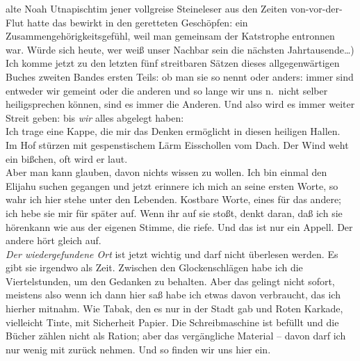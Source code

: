 \documentclass[
]{article}
\begin{document}
alte Noah Utnapischtim jener vollgreise Steineleser aus den Zeiten
von-vor-der-Flut hatte das bewirkt in den geretteten Geschöpfen: ein
Zusammengehörigkeitsgefühl, weil man gemeinsam der Katstrophe entronnen
war. Würde sich heute, wer weiß unser Nachbar sein die nächsten
Jahrtausende\ldots)\\
Ich komme jetzt zu den letzten fünf streitbaren Sätzen dieses
allgegenwärtigen Buches zweiten Bandes ersten Teils: ob man sie so nennt
oder anders: immer sind entweder wir gemeint oder die anderen und so
lange wir uns n.~nicht selber heiligsprechen können, sind es immer die
Anderen. Und also wird es immer weiter Streit geben: bis \emph{wir}
alles abgelegt haben:\\
Ich trage eine Kappe, die mir das Denken ermöglicht in diesen heiligen
Hallen.\\
Im Hof stürzen mit gespenstischem Lärm Eisschollen vom Dach. Der Wind
weht ein bißchen, oft wird er laut.\\
Aber man kann glauben, davon nichts wissen zu wollen. Ich bin einmal den
Elijahu suchen gegangen und jetzt erinnere ich mich an seine ersten
Worte, so wahr ich hier stehe unter den Lebenden. Kostbare Worte, eines
für das andere; ich hebe sie mir für später auf. Wenn ihr auf sie stoßt,
denkt daran, daß ich sie hörenkann wie aus der eigenen Stimme, die
riefe. Und das ist nur ein Appell. Der andere hört gleich auf.\\
\emph{Der wiedergefundene Ort }ist jetzt wichtig und darf nicht
überlesen werden. Es gibt sie irgendwo als Zeit. Zwischen den
Glockenschlägen habe ich die Viertelstunden, um den Gedanken zu
behalten. Aber das gelingt nicht sofort, meistens also wenn ich dann
hier saß habe ich etwas davon verbraucht, das ich hierher mitnahm. Wie
Tabak, den es nur in der Stadt gab und Roten Karkade, vielleicht Tinte,
mit Sicherheit Papier. Die Schreibmaschine ist befüllt und die Bücher
zählen nicht als Ration; aber das vergängliche Material -- davon darf
ich nur wenig mit zurück nehmen. Und so finden wir uns hier ein.
\end{document}

